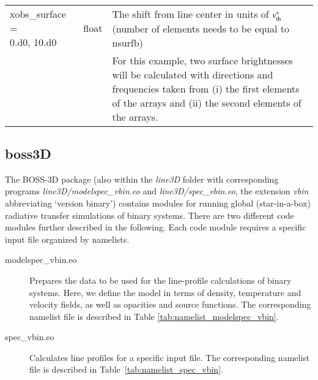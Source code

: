 \documentclass[10pt,a4paper]{article}
\makeatletter
\newcommand{\specialcell}[2][c]{%
  \begin{tabular}[#1]{@{}l@{}}#2\end{tabular}}
\makeatother
\begin{document}
\begin{footnotesize}
\begin{longtable}[h]{p{0.24\linewidth}p{0.07\linewidth}p{0.69\linewidth}}
\specialcell[t]{xobs\_surface = \\  0.d0, 10.d0} & float & The shift from line center in units of $v_{\rm th}^{\rm \ast}$ (number of elements needs to be equal to nsurfb)\\
& & For this example, two surface brightnesses will be calculated with directions and frequencies taken from (i) the first elements of the arrays and (ii) the second elements of the arrays. 
%
\end{longtable}
\end{footnotesize}
%
%
%
%
\subsection{boss3D}
\label{subsec:boss3d}
The BOSS-3D package (also within the \textit{line3D} folder with
corresponding programs \textit{line3D/modelspec\_vbin.eo} and
\textit{line3D/spec\_vbin.eo}, the extension \textit{vbin}
abbreviating `version binary') contains modules for running global
(star-in-a-box) radiative transfer simulations of binary
systems. There are two different code modules further described in the
following. Each code module requires a specific input file organized
by namelists.
%
\begin{description}
\item[modelspec\_vbin.eo] Prepares the data to be used for the
  line-profile calculations of binary systems. Here, we define the
  model in terms of density, temperature and velocity fields, as well
  as opacities and source functions. The corresponding namelist file
  is described in Table \ref{tab:namelist_modelspec_vbin}.
\item[spec\_vbin.eo] Calculates line profiles for a specific input
  file. The corresponding namelist file is described in
  Table~\ref{tab:namelist_spec_vbin}.
\end{description}
%
\end{document}
